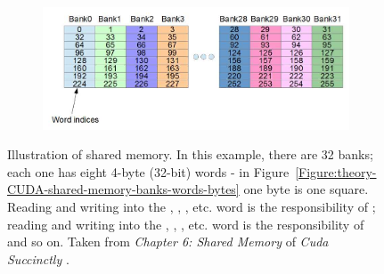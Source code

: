 \begin{figure}[ht!]
	\begin{subfigure}{\textwidth}
		\centering
		\hspace*{-0.8cm}
		\includegraphics[width=13cm, keepaspectratio]{images/ch1/CUDA_shared_memory_banks_words_indices.png}
		\label{Figure:theory-CUDA-shared-memory-banks-words-ids}
	\end{subfigure}
	\caption{Illustration of shared memory. In this example, there are 32 banks; each one has eight 4-byte (32-bit) words - in Figure~\ref{Figure:theory-CUDA-shared-memory-banks-words-bytes} one byte is one square. Reading and writing into the , , , etc. word is the responsibility of ; reading and writing into the , , , etc. word is the responsibility of  and so on. Taken from \emph{Chapter 6: Shared Memory} of \emph{Cuda Succinctly} \cite{Rose2017}.}
	\label{Figure:theory-CUDA-shared-memory-banks-words}
\end{figure}

